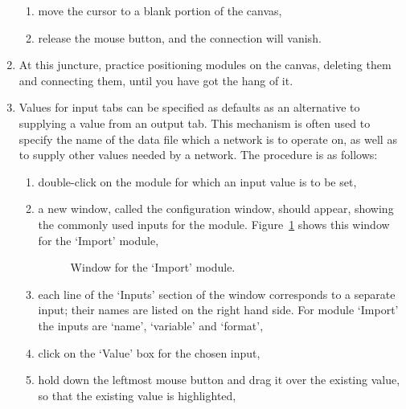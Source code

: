 \begin{enumerate}
\begin{enumerate}
    \item move the cursor to a blank portion of the canvas,

    \item release the mouse button, and the connection will vanish.

  \end{enumerate}

  \item At this juncture, practice positioning modules on the canvas,
   deleting them and connecting them, until you have got the hang of it.

  \item Values for input tabs can be specified as defaults as an
   alternative to supplying a value from an output tab. This mechanism
   is often used to specify the name of the data file which a network
   is to operate on, as well as to supply other values needed by a
   network. The procedure is as follows:

  \begin{enumerate}

    \item double-click on the module for which an input value is to be set,

    \item a new window, called the configuration window, should appear,
     showing the commonly used inputs for the module. Figure~\ref{IMPORT}
     shows this window for the `Import' module,

    \begin{figure}[htbp]

    \begin{center}
    \leavevmode
    \epsfxsize=450pt
    \end{center}

    \caption[Window for the `Import' module.]{Window for the `Import'
     module.\label{IMPORT} }
    

    \end{figure}

    \item each line of the `Inputs' section of the window corresponds
     to a separate input; their names are listed on the right hand
     side. For module `Import' the inputs are `name', `variable' and
     `format',

    \item click on the `Value' box for the chosen input,

    \item hold down the leftmost mouse button and drag it over the
     existing value, so that the existing value is highlighted,


\end{enumerate}
\end{enumerate}
